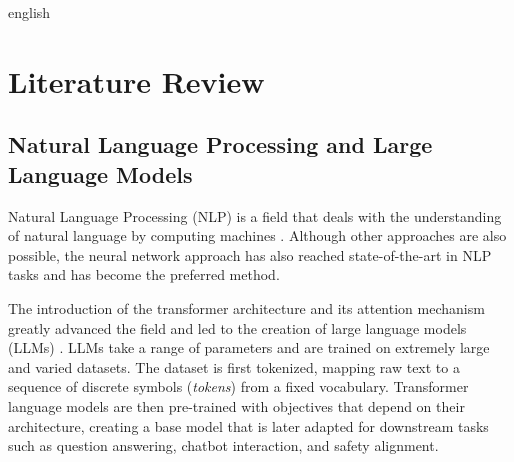 



\begin{otherlanguage*}{english}

    \chapter{Literature Review}

\section{Natural Language Processing and Large Language Models}\label{sec:nlp-llms}
Natural Language Processing (NLP) is a field that deals with the understanding of natural language by computing machines \cite{goldbergPrimerNeuralNetwork2015}. Although other approaches are also possible, the neural network approach has also reached state-of-the-art in NLP tasks and has become the preferred method.

The introduction of the transformer architecture and its attention mechanism \cite{vaswaniAttentionAllYou2023} greatly advanced the field and led to the creation of large language models (LLMs) \cite{grattafioriLlama3Herd2024, openaiGPT4oSystemCard2024}. LLMs take a range of parameters and are trained on extremely large and varied datasets. The dataset is first tokenized, mapping raw text to a sequence of discrete symbols (\emph{tokens}) from a fixed vocabulary. Transformer language models are then pre-trained with objectives that depend on their architecture, creating a base model that is later adapted for downstream tasks such as question answering, chatbot interaction, and safety alignment.


\end{otherlanguage*}
